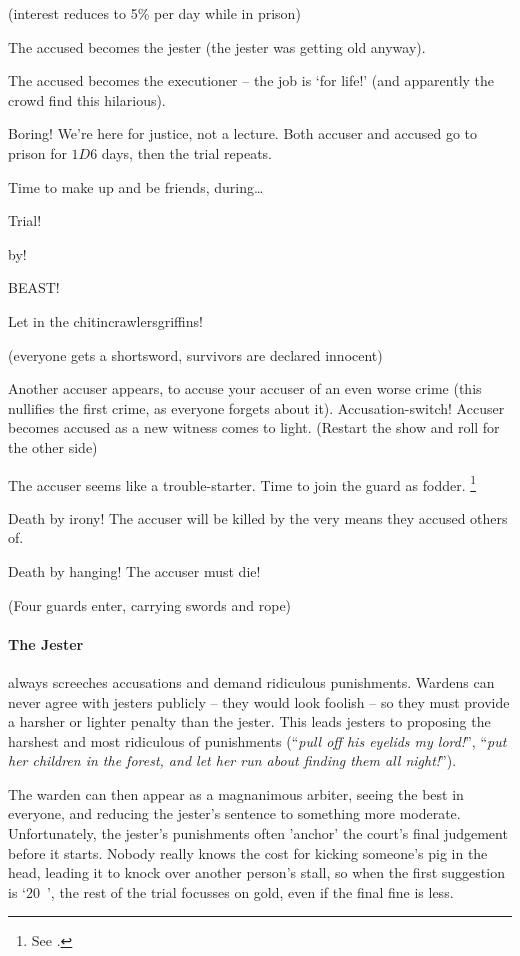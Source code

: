 \begin{multicols}{2}
\begin{dlist}
  (interest reduces to 5\% per day while in prison)
  \item
  The accused becomes the jester (the jester was getting old anyway).
  \item
  The accused becomes the executioner -- the job is `for life!' (and apparently the crowd find this hilarious).
  \item
  Boring!
  We're here for justice, not a lecture.
  Both accuser and accused go to prison for $1D6$ days, then the trial repeats.
  \item
  Time to make up and be friends, during\ldots

  Trial!

  by!

  BEAST!

  Let in the \ifodd\value{r4} chitincrawlers\else griffins\fi!

  (everyone gets a shortsword, survivors are declared innocent)
  \item
  \ifodd\value{r3}
    Another accuser appears, to accuse your accuser of an even worse crime (this nullifies the first crime, as everyone forgets about it).
  \else
    Accusation-switch!
    Accuser becomes accused as a new witness comes to light.
    (Restart the show and roll for the other side)
  \fi
  \item
  The accuser seems like a trouble-starter.
  Time to join the \gls{guard} as fodder.%
  \footnote{See .}
  \item
  Death by irony!
  The accuser will be killed by the very means they accused others of.
  \item
  Death by hanging!
  The accuser must die!

  (Four guards enter, carrying swords and rope)
\end{dlist}

\paragraph{The Jester}
\label{guildJester}%
always screeches accusations and demand ridiculous punishments.
Wardens can never agree with jesters publicly -- they would look foolish -- so they must provide a harsher or lighter penalty than the jester.
This leads jesters to proposing the harshest and most ridiculous of punishments (``\emph{pull off his eyelids my lord!}'', ``\emph{put her children in the forest, and let her run about finding them all night!}'').

The warden can then appear as a magnanimous arbiter, seeing the best in everyone, and reducing the jester's sentence to something more moderate.
Unfortunately, the jester's punishments often 'anchor' the court's final judgement before it starts.
Nobody really knows the cost for kicking someone's pig in the head, leading it to knock over another person's stall, so when the first suggestion is `20~', the rest of the trial focusses on gold, even if the final fine is less.


\end{multicols}
